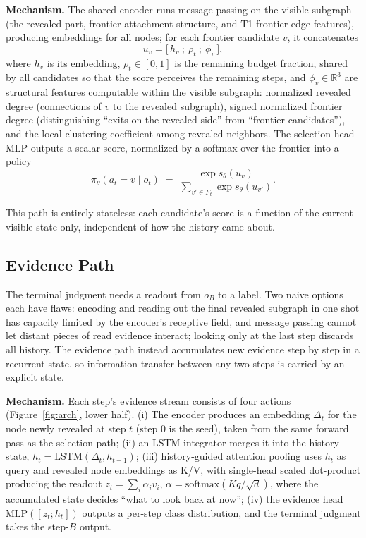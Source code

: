 \documentclass{article}
\begin{document}
\textbf{Mechanism.} The shared encoder runs message passing on the visible subgraph (the revealed part, frontier attachment structure, and T1 frontier edge features), producing embeddings for all nodes; for each frontier candidate $v$, it concatenates
\[
u_v=\big[\,h_v\ ;\ \rho_t\ ;\ \phi_v\,\big],
\]
where $h_v$ is its embedding, $\rho_t\in[0,1]$ is the remaining budget fraction, shared by all candidates so that the score perceives the remaining steps, and $\phi_v\in\mathbb R^3$ are structural features computable within the visible subgraph: normalized revealed degree (connections of $v$ to the revealed subgraph), signed normalized frontier degree (distinguishing ``exits on the revealed side'' from ``frontier candidates''), and the local clustering coefficient among revealed neighbors. The selection head $\mathrm{MLP}$ outputs a scalar score, normalized by a softmax over the frontier into a policy
\[
\pi_\theta(a_t{=}v\mid o_t)\;=\;\frac{\exp s_\theta(u_v)}{\sum_{v'\in F_t}\exp s_\theta(u_{v'})}.
\]

This path is entirely stateless: each candidate's score is a function of the current visible state only, independent of how the history came about.

\subsection{Evidence Path}
\label{subsec:evidence}

The terminal judgment needs a readout from $o_B$ to a label. Two naive options each have flaws: encoding and reading out the final revealed subgraph in one shot has capacity limited by the encoder's receptive field, and message passing cannot let distant pieces of read evidence interact; looking only at the last step discards all history. The evidence path instead accumulates new evidence step by step in a recurrent state, so information transfer between any two steps is carried by an explicit state.

\textbf{Mechanism.} Each step's evidence stream consists of four actions (Figure~\ref{fig:arch}, lower half). (i) The encoder produces an embedding $\Delta_t$ for the node newly revealed at step $t$ (step 0 is the seed), taken from the same forward pass as the selection path; (ii) an LSTM integrator merges it into the history state, $h_t=\mathrm{LSTM}(\Delta_t,h_{t-1})$; (iii) history-guided attention pooling uses $h_t$ as query and revealed node embeddings as K/V, with single-head scaled dot-product producing the readout $z_t=\sum_i\alpha_i v_i$, $\alpha=\mathrm{softmax}(Kq/\sqrt d)$, where the accumulated state decides ``what to look back at now''; (iv) the evidence head $\mathrm{MLP}([z_t;h_t])$ outputs a per-step class distribution, and the terminal judgment takes the step-$B$ output.
\end{document}

